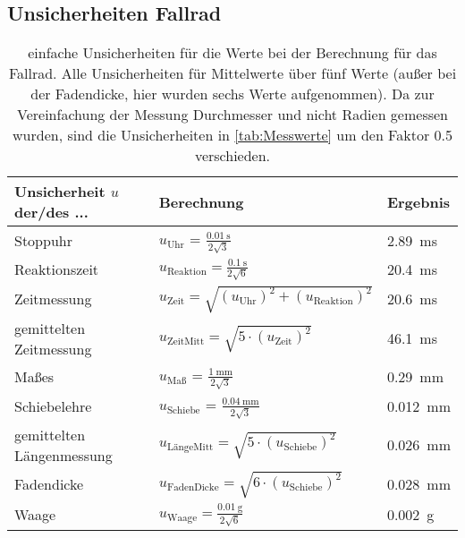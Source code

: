 \documentclass[11pt,a4paper,titlepage, ngerman]{article}
\begin{document}
	
	\subsection{Unsicherheiten Fallrad}
	
	\begin{table}[ht]
		\centering
		\caption{einfache Unsicherheiten für die Werte bei der Berechnung für das Fallrad. Alle Unsicherheiten für Mittelwerte über fünf Werte (außer bei der Fadendicke, hier wurden sechs Werte aufgenommen). Da zur Vereinfachung der Messung Durchmesser und nicht Radien gemessen wurden, sind die Unsicherheiten in \ref{tab:Messwerte} um den Faktor 0.5 verschieden.}
		\begin{tabular}{l|l|l}
			{Unsicherheit $u$ der/des ...} & {Berechnung}  & {Ergebnis}\\
			\hline 
			{Stoppuhr} &  {$u_\text{Uhr}$ = $\frac{\SI{0,01}{\second}}{2\sqrt{3}}$} & {\SI{2,89}{\milli\second}} \\
			{Reaktionszeit} & {$u_\text{Reaktion} = \frac{\SI{0,1}{\second}}{2\sqrt{6}}$} & {\SI{20,4}{\milli\second}} \\
			{Zeitmessung} & {$u_\text{Zeit} = \sqrt{\left( u_\text{Uhr}\right) ^2+\left( u_\text{Reaktion}\right) ^2}$} & {\SI{20,6}{\milli\second}} \\
			{gemittelten Zeitmessung} & {$u_\text{ZeitMitt} = \sqrt{5\cdot\left(u_\text{Zeit}\right) ^2}$} & {\SI{46,1}{\milli\second}} \\
			\hline 
			{Maßes} &  {$u_\text{Maß}$ = $\frac{\SI{1}{\mm}}{2\sqrt{3}}$} & {\SI{0,29}{\mm}} \\
			{Schiebelehre} &  {$u_\text{Schiebe}$ = $\frac{\SI{0,04}{\mm}}{2\sqrt{3}}$} & {\SI{0,012}{\mm}} \\
			{gemittelten Längenmessung} &  {$u_\text{LängeMitt} = \sqrt{5\cdot\left(u_\text{Schiebe}\right) ^2}$} & {\SI{0,026}{\mm}} \\
			{Fadendicke} &  {$u_\text{FadenDicke} = \sqrt{6\cdot\left(u_\text{Schiebe}\right) ^2}$} & {\SI{0,028}{\mm}} \\
			\hline
			{Waage} & {$u_\text{Waage} = \frac{\SI{0,01}{\g}}{2\sqrt{6}}$} & \SI{0,002}{\g}{}
		\end{tabular}
	\end{table}
\end{document}
